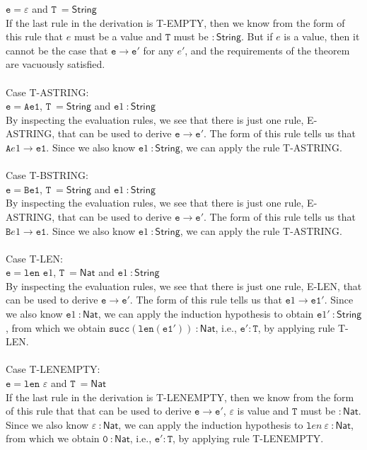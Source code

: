 \documentclass[a4paper]{article}
\begin{document}
$\mathtt {e = \varepsilon}$ and $\mathtt T~\mathsf {= String}$\\
If the last rule in the derivation is T-EMPTY, then we know from the form of this rule that $e$ must be a value and $\mathtt T$ must be $\mathsf { : String}$. But if $e$ is a value, then it cannot be the case that $\mathtt e \rightarrow \mathtt{e'}$ for any $e'$, and the requirements of the theorem are vacuously satisfied.\\\\
Case T-ASTRING:\\
$\mathtt {e = Ae1}$, $\mathtt T~\mathsf {= String}$ and $\mathtt e1 ~\mathsf {: String}$\\
By inspecting the evaluation rules, we see that there is just one rule, E-ASTRING, that can be used to derive $\mathtt e \rightarrow \mathtt{e'}$. The form of this rule tells us that $\mathtt Ae1 \rightarrow \mathtt{e1}$. Since we also know $\mathtt e1 ~\mathsf {: String}$, we can apply the rule T-ASTRING.\\\\
Case T-BSTRING:\\
$\mathtt {e = Be1}$, $\mathtt T~\mathsf {= String}$ and $\mathtt e1 ~\mathsf {: String}$\\
By inspecting the evaluation rules, we see that there is just one rule, E-ASTRING, that can be used to derive $\mathtt e \rightarrow \mathtt{e'}$. The form of this rule tells us that $\mathtt Be1 \rightarrow \mathtt{e1}$. Since we also know $\mathtt e1 ~\mathsf {: String}$, we can apply the rule T-ASTRING.\\\\
Case T-LEN:\\
$\mathtt {e = len}$ $\mathtt e1$, $\mathtt T~\mathsf {= Nat}$ and $\mathtt e1 ~\mathsf {: String}$\\
By inspecting the evaluation rules, we see that there is just one rule, E-LEN, that can be used to derive $\mathtt e \rightarrow \mathtt{e'}$. The form of this rule tells us that $\mathtt e1 \rightarrow \mathtt{e1'}$. Since we also know $\mathtt e1 ~\mathsf {: Nat}$, we can apply the induction hypothesis to obtain $\mathtt e1' ~\mathsf {: String}$, from which we obtain $\mathtt {succ(len(e1'))} ~\mathsf {: Nat}$, i.e., $\mathtt{e'} : \mathtt T$, by applying rule T-LEN.\\\\
Case T-LENEMPTY:\\
$\mathtt {e = len}$ $\mathtt \varepsilon$ and $\mathtt T~\mathsf {= Nat}$\\
If the last rule in the derivation is T-LENEMPTY, then we know from the form of this rule that that can be used to derive $\mathtt e \rightarrow \mathtt{e'}$, $\varepsilon$ is value and $\mathtt T$ must be $\mathsf { : Nat}$. Since we also know $\mathtt \varepsilon ~\mathsf {: Nat}$, we can apply the induction hypothesis to $\mathtt len \ \varepsilon ~\mathsf {: Nat}$, from which we obtain $\mathtt 0 ~\mathsf {: Nat}$, i.e., $\mathtt{e'} : \mathtt T$, by applying rule T-LENEMPTY.\\\\
\end{document}

